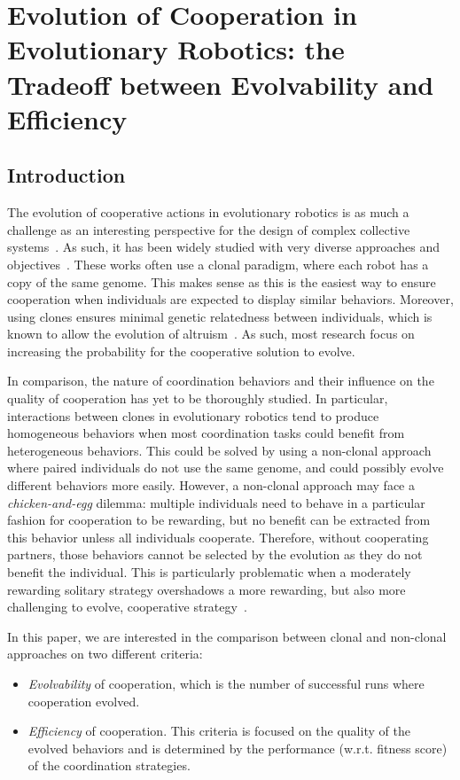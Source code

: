 \section{Evolution of Cooperation in Evolutionary Robotics: the Tradeoff between Evolvability and Efficiency}

  \subsection{Introduction}

  The evolution of cooperative actions in evolutionary robotics is as much a challenge as an interesting perspective for the design of complex collective systems~\cite{Doncieux2015}. As such, it has been widely studied with very diverse approaches and objectives~\cite{Waibel2009, Hauert2014, Trianni2007, Lichocki2012}. These works often use a clonal paradigm, where each robot has a copy of the same genome. This makes sense as this is the easiest way to ensure cooperation when individuals are expected to display similar behaviors. Moreover, using clones ensures minimal genetic relatedness between individuals, which is known to allow the evolution of altruism~\cite{Waibel2011, Montanier2011}. As such, most research focus on increasing the probability for the cooperative solution to evolve.

  In comparison, the nature of coordination behaviors and their influence on the quality of cooperation has yet to be thoroughly studied. In particular, interactions between clones in evolutionary robotics tend to produce homogeneous behaviors when most coordination tasks could benefit from heterogeneous behaviors. This could be solved by using a non-clonal approach where paired individuals do not use the same genome, and could possibly evolve different behaviors more easily. However, a non-clonal approach may face a \emph{chicken-and-egg} dilemma: multiple individuals need to behave in a particular fashion for cooperation to be rewarding, but no benefit can be extracted from this behavior unless all individuals cooperate. Therefore, without cooperating partners, those behaviors cannot be selected by the evolution as they do not benefit the individual. This is particularly problematic when a moderately rewarding solitary strategy overshadows a more rewarding, but also more challenging to evolve, cooperative strategy~\cite{Skyrms2004}.

  In this paper, we are interested in the comparison between clonal and non-clonal approaches on two different criteria:
 \begin{itemize}
    \item{\emph{Evolvability} of cooperation, which is the number of successful runs where cooperation evolved.}
    \item{\emph{Efficiency} of cooperation. This criteria is focused on the quality of the evolved behaviors and is determined by the   performance (w.r.t. fitness score) of the coordination strategies.}
  \end{itemize}

